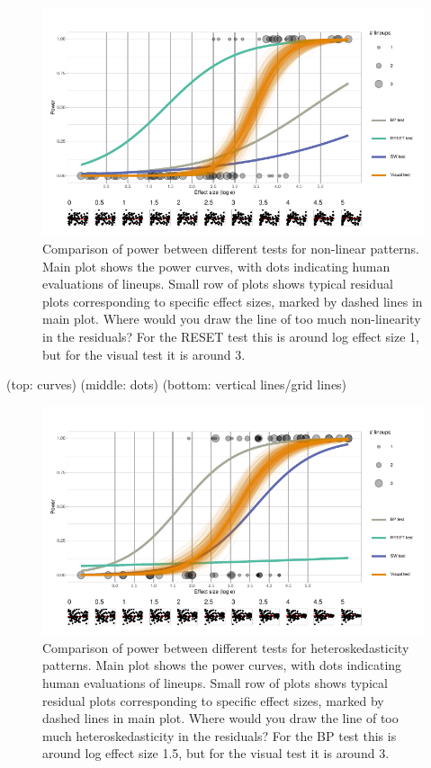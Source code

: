 \documentclass[]{interact}
\theoremstyle{plain}%
\theoremstyle{definition}
\theoremstyle{remark}
\begin{document}
\begin{figure}

{\centering \includegraphics[width=1\linewidth]{paper_comparison_files/figure-latex/polypower-1} 

}

\caption{Comparison of power between different tests for non-linear patterns. Main plot shows the power curves, with dots indicating human evaluations of lineups. Small row of plots shows typical residual plots corresponding to specific effect sizes, marked by dashed lines in main plot. Where would you draw the line of too much non-linearity in the residuals? For the RESET test this is around log effect size 1, but for the visual test it is around 3.}\label{fig:polypower}
\end{figure}

(top: curves) (middle: dots) (bottom: vertical lines/grid lines)

\begin{figure}

{\centering \includegraphics[width=1\linewidth]{paper_comparison_files/figure-latex/heterpower-1} 

}

\caption{Comparison of power between different tests for heteroskedasticity patterns. Main plot shows the power curves, with dots indicating human evaluations of lineups. Small row of plots shows typical residual plots corresponding to specific effect sizes, marked by dashed lines in main plot. Where would you draw the line of too much heteroskedasticity in the residuals? For the BP test this is around log effect size 1.5, but for the visual test it is around 3.}\label{fig:heterpower}
\end{figure}
\end{document}
